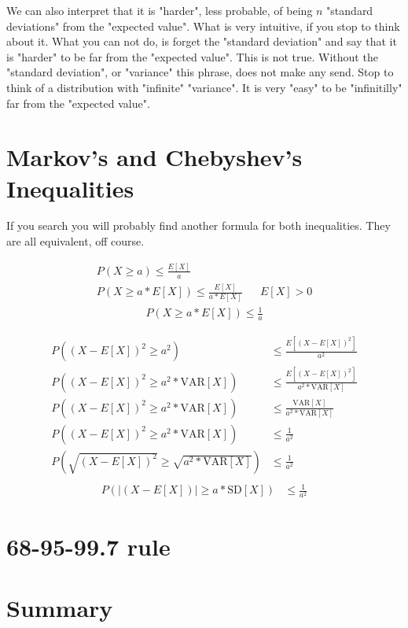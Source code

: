 \documentclass[10pt,a4paper]{book}
\begin{document}
We can also interpret that it is "harder", less probable, of being $n$ "standard deviations" from the "expected value". What is very intuitive, if you stop to think about it. What you can not do, is forget the "standard deviation" and say that it is "harder" to be far from the "expected value". This is not true. Without the "standard deviation", or "variance" this phrase, does not make any send. Stop to think of a distribution with "infinite" "variance". It is very "easy" to be "infinitilly" far from the "expected value".

\section{Markov's and Chebyshev's Inequalities}

If you search you will probably find another formula for both inequalities. They are all equivalent, off course.

\begin{align*}
	P(X \ge a) \le \frac{E[X]}{a}\\	
	P(X \ge a*E[X]) \le \frac{E[X]}{a*E[X]} && E[X] > 0
\end{align*}
\begin{align}
	P(X \ge a*E[X]) \le \frac{1}{a}
\end{align}

\begin{align*}
P((X-E[X])^2 \ge a^2) &\le \frac{E[(X-E[X])^2]}{a^2}\\
P((X-E[X])^2 \ge a^2*\text{VAR}[X]) &\le \frac{E[(X-E[X])^2]}{a^2*\text{VAR}[X]}\\
P((X-E[X])^2 \ge a^2*\text{VAR}[X]) &\le \frac{\text{VAR}[X]}{a^2*\text{VAR}[X]}\\
P((X-E[X])^2 \ge a^2*\text{VAR}[X]) &\le \frac{1}{a^2}\\
P(\sqrt{(X-E[X])^2}\ge\sqrt{a^2*\text{VAR}[X]}) &\le \frac{1}{a^2}\\
\end{align*}
\begin{align}
P(|(X-E[X])| \ge a*\text{SD}[X]) &\le \frac{1}{a^2}
\end{align}

\section{68-95-99.7 rule}

\section{Summary}
\end{document}
